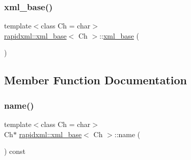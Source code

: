 \mbox{\label{classrapidxml_1_1xml__base_a23e7f7aac02d17a0a01afb597e4b966b}} 
\subsubsection{\texorpdfstring{xml\+\_\+base()}{xml\_base()}\hspace{0.1cm}{\footnotesize\ttfamily [2/2]}}
{\footnotesize\ttfamily template$<$class Ch  = char$>$ \\
\mbox{\hyperlink{classrapidxml_1_1xml__base}{rapidxml\+::xml\+\_\+base}}$<$ Ch $>$\+::\mbox{\hyperlink{classrapidxml_1_1xml__base}{xml\+\_\+base}} (\begin{DoxyParamCaption}{ }\end{DoxyParamCaption})\hspace{0.3cm}{\ttfamily [inline]}}



\subsection{Member Function Documentation}
\mbox{\label{classrapidxml_1_1xml__base_aef8ae147fbee59209f714274afc80dc4}} 
\subsubsection{\texorpdfstring{name()}{name()}\hspace{0.1cm}{\footnotesize\ttfamily [1/6]}}
{\footnotesize\ttfamily template$<$class Ch  = char$>$ \\
Ch$\ast$ \mbox{\hyperlink{classrapidxml_1_1xml__base}{rapidxml\+::xml\+\_\+base}}$<$ Ch $>$\+::name (\begin{DoxyParamCaption}{ }\end{DoxyParamCaption}) const\hspace{0.3cm}{\ttfamily [inline]}}

